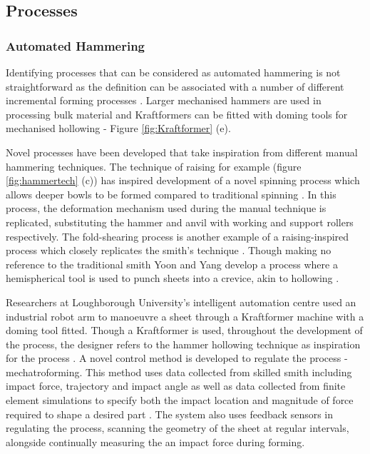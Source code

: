 \subsection{Processes} \label{sec:MechanisedProcess}
\subsubsection{Automated Hammering} \label{sec:MechHammer}
Identifying processes that can be considered as automated hammering is not straightforward as the definition can be associated with a number of different incremental forming processes \citep{Emmens2010TheHistory}. Larger mechanised hammers are used in processing bulk material \citep{Lange1986HandbookForming} and Kraftformers can be fitted with doming tools for mechanised hollowing - Figure \ref{fig:Kraftformer} (e).

Novel processes have been developed that take inspiration from different manual hammering techniques. The technique of raising for example (figure \ref{fig:hammertech} (c)) has inspired development of a novel spinning process which allows deeper bowls to be formed compared to traditional spinning \citep{Russo2020RaisingSpinning}. In this process, the deformation mechanism used during the manual technique is replicated, substituting the hammer and anvil with working and support rollers respectively. The fold-shearing process is another example of a raising-inspired process which closely replicates the smith's technique \citep{Allwood2019Folding-shearing:Change}. Though making no reference to the traditional smith Yoon and Yang develop a process where a hemispherical tool is used to punch sheets into a crevice, akin to hollowing \citep{Yoon2001InvestigationMetal}. 

Researchers at Loughborough University's intelligent automation centre used an industrial robot arm to manoeuvre a sheet through a Kraftformer machine with a doming tool fitted. Though a Kraftformer is used, throughout the development of the process, the designer refers to the hammer hollowing technique as inspiration for the process \citep{Ilangovan2016FixturelessForming}. A novel control method is developed to regulate the process - mechatroforming. This method uses data collected from skilled smith including impact force, trajectory and impact angle as well as data collected from finite element simulations to specify both the impact location and magnitude of force required to shape a desired part \citep{Ilangovan2016AnForming}. The system also uses feedback sensors in regulating the process, scanning the geometry of the sheet at regular intervals, alongside continually measuring the an impact force during forming.

